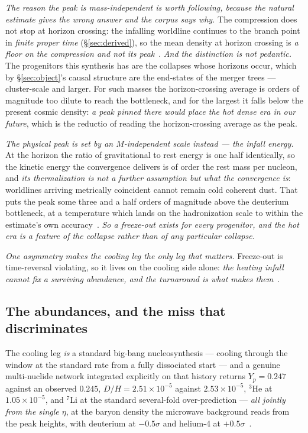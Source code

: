 \documentclass[11pt,a4paper]{article}
\theoremstyle{plain}
\theoremstyle{definition}
\begin{document}
\emph{The reason the peak is mass-independent is worth following, because the natural estimate gives the
wrong answer and the corpus says why.} The compression does not stop at horizon crossing: the infalling
worldline continues to the branch point in \emph{finite proper time} (\S\ref{sec:derived}), so the mean
density at horizon crossing is \emph{a floor on the compression and not its peak}~\cite{JanzenCosmogenesis}.
\emph{And the distinction is not pedantic.} The progenitors this synthesis has are the collapses whose
horizons occur, which by \S\ref{sec:object}'s causal structure are the end-states of the merger trees ---
cluster-scale and larger. For such masses the horizon-crossing average is orders of magnitude too dilute to
reach the bottleneck, and for the largest it falls below the present cosmic density: \emph{a peak pinned
there would place the hot dense era in our future}, which is the reductio of reading the horizon-crossing
average as the peak.

\emph{The physical peak is set by an $M$-independent scale instead --- the infall energy.} At the horizon the
ratio of gravitational to rest energy is one half identically, so the kinetic energy the convergence delivers
is of order the rest mass per nucleon, and \emph{its thermalization is not a further assumption but what the
convergence is}: worldlines arriving metrically coincident cannot remain cold coherent dust. That puts the
peak some three and a half orders of magnitude above the deuterium bottleneck, at a temperature which lands
on the hadronization scale to within the estimate's own accuracy~\cite{JanzenCosmogenesis}. \emph{So a
freeze-out exists for every progenitor, and the hot era is a feature of the collapse rather than of any
particular collapse.}

\emph{One asymmetry makes the cooling leg the only leg that matters.} Freeze-out is time-reversal violating,
so it lives on the cooling side alone: \emph{the heating infall cannot fix a surviving abundance, and the
turnaround is what makes them}~\cite{JanzenCosmogenesis}.

\subsection{The abundances, and the miss that discriminates}

The cooling leg \emph{is} a standard big-bang nucleosynthesis --- cooling through the window at the standard
rate from a fully dissociated start --- and a genuine multi-nuclide network integrated explicitly on that
history returns $Y_p=0.247$ against an observed $0.245$, $D/H=2.51\times10^{-5}$ against $2.53\times10^{-5}$,
${}^{3}$He at $1.05\times10^{-5}$, and ${}^{7}$Li at the standard several-fold over-prediction --- \emph{all
jointly from the single $\eta$}, at the baryon density the microwave background reads from the peak
heights, with deuterium at $-0.5\sigma$ and helium-4 at $+0.5\sigma$~\cite{JanzenCosmogenesis}.
\end{document}
